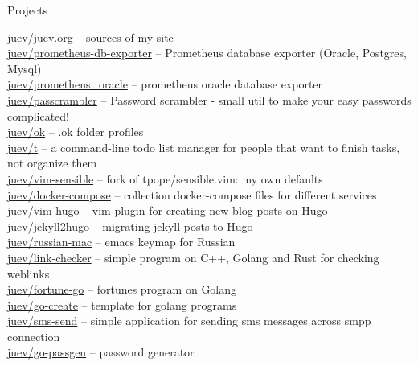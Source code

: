 \documentclass{resume} %
\begin{document}
\begin{rSection}{Projects}

\href{https://github.com/juev/juev.org}{juev/juev.org} -- sources of my site \\ %
\href{https://github.com/juev/prometheus-db-exporter}{juev/prometheus-db-exporter} -- Prometheus database exporter (Oracle, Postgres, Mysql) \\ %
\href{https://github.com/juev/prometheus\_oracle}{juev/prometheus\_oracle} -- prometheus oracle database exporter \\ %
\href{https://github.com/juev/passcrambler}{juev/passcrambler} -- Password scrambler - small util to make your easy passwords complicated! \\ %
\href{https://github.com/juev/ok}{juev/ok} -- .ok folder profiles  \\ %
\href{https://github.com/juev/t}{juev/t} -- a command-line todo list manager for people that want to finish tasks, not organize them \\ %
\href{https://github.com/juev/vim-sensible}{juev/vim-sensible} -- fork of tpope/sensible.vim: my own defaults \\ %
\href{https://github.com/juev/docker-compose}{juev/docker-compose} -- collection docker-compose files for different services \\ %
\href{https://github.com/juev/vim-hugo}{juev/vim-hugo} -- vim-plugin for creating new blog-posts on Hugo \\ %
\href{https://github.com/juev/jekyll2hugo}{juev/jekyll2hugo} -- migrating jekyll posts to Hugo \\ %
\href{https://github.com/juev/russian-mac}{juev/russian-mac} -- emacs keymap for Russian \\ %
\href{https://github.com/juev/link-checker}{juev/link-checker} -- simple program on C++, Golang and Rust for checking weblinks \\ %
\href{https://github.com/juev/fortune-go}{juev/fortune-go} -- fortunes program on Golang \\ %
\href{https://github.com/juev/go-create}{juev/go-create} -- template for golang programs \\ %
\href{https://github.com/juev/sms-send}{juev/sms-send} -- simple application for sending sms messages across smpp connection \\ %
\href{https://github.com/juev/go-passgen}{juev/go-passgen} -- password generator \\ %

\end{rSection}
\end{document}
